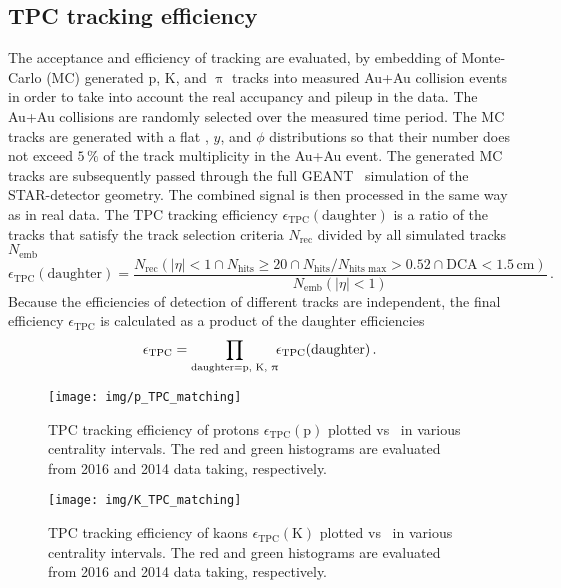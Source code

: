 \subsection{TPC tracking efficiency}

The acceptance and efficiency of tracking are evaluated, by embedding of Monte-Carlo (MC) generated p, K, and $\uppi$ tracks into measured Au+Au collision events in order to take into account the real accupancy and pileup in the data. The Au+Au collisions are randomly selected over the measured time period. The MC tracks are generated with a flat \pt, $y$, and $\phi$ distributions so that their number does not exceed $5\,\%$ of the track multiplicity in the Au+Au event. The generated MC tracks are subsequently passed through the full GEANT~\cite{GEANT} simulation of the STAR-detector geometry. The combined signal is then processed in the same way as in real data. The TPC tracking efficiency $\epsilon_\mathrm{TPC}(\text{daughter})$ is a ratio of the tracks that satisfy the track selection criteria $N_\mathrm{rec}$ divided by all simulated tracks $N_\mathrm{emb}$
\begin{equation}
 \epsilon_\mathrm{TPC}(\text{daughter}) = \frac{N_\mathrm{rec}(|\eta|<1 \cap N_\mathrm{hits} \geq 20 \cap N_\mathrm{hits} / N_\text{hits max} > 0.52 \cap \text{DCA} < 1.5\,\text{cm})}{N_\mathrm{emb}(|\eta|<1)}\,.
\end{equation}
Because the efficiencies of detection of different tracks are independent, the final efficiency $\epsilon_\mathrm{TPC}$ is calculated as a product of the daughter efficiencies 
\begin{equation}
 \epsilon_\mathrm{TPC} = \prod_{\text{daughter}=\text{p, K, }\uppi}\!\!\epsilon_\mathrm{TPC}(\text{daughter})\,.
\end{equation}

\begin{figure}[!htb]
\centering
\texttt{[image: img/p\_TPC\_matching]}
\vspace{-0.8cm}
\caption[TPC tracking efficiency of protons.]{\label{pTPCeff} TPC tracking efficiency of protons $\epsilon_\mathrm{TPC}(\mathrm{p})$ plotted vs \pt\ in various centrality intervals. The red and green histograms are evaluated from 2016 and 2014 data taking, respectively.}

\end{figure}

\begin{figure}[!htb]
\centering
\texttt{[image: img/K\_TPC\_matching]}
\vspace{-0.8cm}
\caption[TPC tracking efficiency of kaons.]{\label{KTPCeff} TPC tracking efficiency of kaons $\epsilon_\mathrm{TPC}(\mathrm{K})$ plotted vs \pt\ in various centrality intervals. The red and green histograms are evaluated from 2016 and 2014 data taking, respectively.}

\end{figure}

